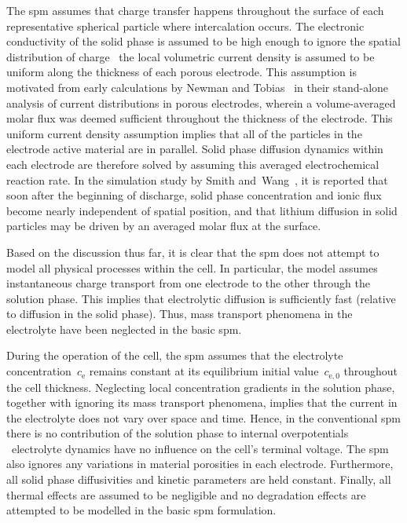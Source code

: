 The  \gls{spm}  assumes that  charge  transfer  happens throughout  the  surface
of  each  representative  spherical  particle where  intercalation  occurs.  The
electronic  conductivity of  the solid  phase is  assumed to  be high  enough to
ignore the spatial distribution  of charge \ie~the local  volumetric current
density is assumed  to be uniform along the thickness  of each porous electrode.
This assumption is  motivated from early calculations by Newman and
Tobias~\cite{Newman1962} in their stand-alone  analysis of current distributions
in porous electrodes, wherein a volume-averaged molar flux was deemed sufficient
throughout  the  thickness  of  the  electrode.  This  uniform  current  density
assumption implies  that all of the  particles in the electrode  active material
are  in parallel.  Solid  phase  diffusion dynamics  within  each electrode  are
therefore solved by assuming this averaged electrochemical reaction rate. In the
simulation study  by Smith and~Wang~\cite{Smith2006},  it is reported  that soon
after  the beginning  of discharge,  solid  phase concentration  and ionic  flux
become nearly  independent of  spatial position, and  that lithium  diffusion in
solid particles may be driven by an averaged molar flux at the surface.


Based  on the  discussion thus  far, it  is clear  that the  \gls{spm} does  not
attempt to  model all  physical processes  within the  cell. In  particular, the
model assumes  instantaneous charge  transport from one  electrode to  the other
through  the  solution  phase.  This  implies  that  electrolytic  diffusion  is
sufficiently  fast  (relative to  diffusion  in  the  solid phase).  Thus,  mass
transport  phenomena  in  the  electrolyte  have been  neglected  in  the  basic
\gls{spm}.


During   the  operation   of  the   cell,   the  \gls{spm}   assumes  that   the
electrolyte  concentration~$c_\text{e}$  remains  constant  at  its  equilibrium
initial value~$c_{\text{e},0}$  throughout the cell thickness.  Neglecting local
concentration gradients in  the solution phase, together with  ignoring its mass
transport phenomena, implies  that the current in the electrolyte  does not vary
over  space  and  time.  Hence,  in  the  conventional  \gls{spm}  there  is  no
contribution of the solution phase  to internal overpotentials \ie~electrolyte
dynamics have  no influence on the  cell's terminal voltage. The  \gls{spm} also
ignores any  variations in material  porosities in each  electrode. Furthermore,
all solid phase diffusivities and kinetic parameters are held constant. Finally,
all thermal effects are assumed to  be negligible and no degradation effects are
attempted to be modelled in the basic \gls{spm} formulation.

